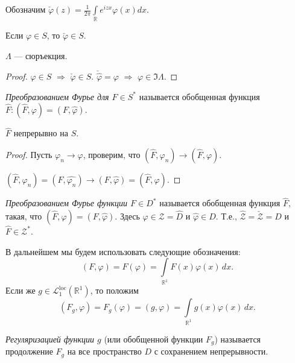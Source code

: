 \documentclass[12pt,titlepage, a4paper]{article}
\begin{document}
Обозначим $\check \varphi(z)=
\frac{1}{2\pi}\int\limits_{\mathbb{R}}e^{izx}\varphi(x)dx$.

\begin{predl}
Если $\varphi\in S$, то $\check\varphi\in S$.
\end{predl}

\begin{predl}
$\Lambda$ --- сюръекция.
\end{predl}

\begin{proof}
$\varphi\in S$ $\Rightarrow$ $\check\varphi\in S$.
$\check{\hat\varphi}=\varphi$ $\Rightarrow$ $\varphi\in \Im
\Lambda$.
\end{proof}


\begin{defen}
\emph{Преобразованием Фурье для $F\in S^*$} называется обобщенная
функция $\hat F : (\hat F,\varphi)=(F,\hat\varphi)$.
\end{defen}

\begin{predl}
$\hat F$ непрерывно на $S$.
\end{predl}

\begin{proof}
Пусть $\varphi_n\rightarrow\varphi$, проверим, что $(\hat
F,\varphi_n)\rightarrow (\hat F,\varphi)$.

$(\hat F,\varphi_n)=(F,\widehat{\varphi_n})\rightarrow
(F,\hat\varphi)=(\hat F,\varphi)$.
\end{proof}

\lecture

\begin{defen}
\emph{Преобразованием Фурье функции $F\in D^*$} называется
обобщенная функция $\hat{F}$, такая, что
$(\hat{F},\varphi)=(F,\hat{\varphi})$. Здесь $\varphi\in
\mathcal{Z}=\hat{D}$ и $\hat{\varphi}\in D$. Т.е.,
$\hat{\mathcal{Z}}=\check{\mathcal{Z}}=D$ и
$\hat{F}\in\mathcal{Z}^*$.
\end{defen}

В дальнейшем мы будем использовать следующие обозначения:
$$(F,\varphi)=F(\varphi)=\int\limits_{\mathbb{R}^1}\!F(x)\varphi(x)\,dx.$$
Если же $g\in\mathcal{L}^{\mathrm{loc}}_1(\mathbb{R}^1)$, то положим
$$(F_g,\varphi)=F_g(\varphi)=(g,\varphi)=\int\limits_{\mathbb{R}^1}\!g(x)\varphi(x)\,dx.$$

\begin{defen}
\emph{Регуляризацией функции $g$} (или обобщенной функции $F_g$)
называется продолжение $F_g$ на все пространство $D$ с сохранением
непрерывности.
\end{defen}
\end{document}
